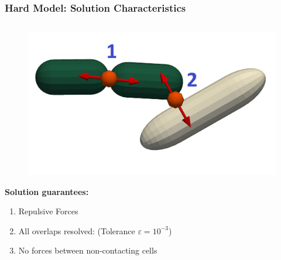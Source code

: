 \documentclass[10pt,t]{beamer}
\begin{document}
\begin{frame}
    \frametitle{Hard Model: Solution Characteristics}

    \vspace{-0.5cm}
    \begin{columns}[c]
        \begin{column}{0.4\textwidth}
            \begin{figure}
                \centering
                \includegraphics[width=1\textwidth]{figures/constraints_example_small.jpeg}
            \end{figure}

            \textbf{Solution guarantees:}
            \begin{enumerate}
                \item {Repulsive Forces}
                \item {All overlaps resolved: (Tolerance $\varepsilon = 10^{-3}$)}
                \item {No forces between non-contacting cells}
            \end{enumerate}

        \end{column}


\end{columns}
\end{frame}
\end{document}
